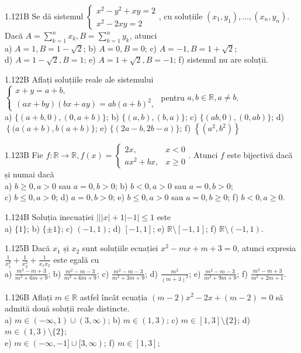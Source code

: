 \documentclass[11pt]{article}
\begin{document}
1.121B Se dă sistemul $\left\{\begin{array}{l}x^{2}-y^{2}+x y=2 \\ x^{2}-2 x y=2\end{array}\right.$, cu soluțiile $\left(x_{1}, y_{1}\right), \ldots,\left(x_{n}, y_{n}\right)$. Dacă $A=\sum_{k=1}^{n} x_{k}, B=\sum_{k=1}^{n} y_{k}$, atunci\\ a) $A=1, B=1-\sqrt{2}$; b) $A=0, B=0$; c) $A=-1, B=1+\sqrt{2}$;\\ d) $A=1-\sqrt{2}, B=1$; e) $A=1+\sqrt{2}, B=-1$; f) sistemul nu are soluții.

1.122B Aflați soluțiile reale ale sistemului $\left\{\begin{array}{l}x+y=a+b, \\ (a x+b y)(b x+a y)=a b(a+b)^{2},\end{array}\right.$ pentru $a, b \in \mathbb{R}, a \neq b$.\\ a) $\{(a+b, 0),(0, a+b)\}$; b) $\{(a, b),(b, a)\}$; c) $\{(a b, 0),(0, a b)\}$; d) $\left\{(a(a+b), b(a+b)\}\right.$; e) $\{(2a-b, 2b-a)\}$; f) $\left\{\left(a^{2}, b^{2}\right)\right\}$

1.123B Fie $f: \mathbb{R} \rightarrow \mathbb{R}, f(x)=\left\{\begin{array}{ll}2 x, & x<0 \\ a x^{2}+b x, & x \geq 0\end{array}\right.$. Atunci $f$ este bijectivă dacă și numai dacă\\ a) $b \geq 0, a>0$ sau $a=0, b>0$; b) $b<0, a>0$ sau $a=0, b>0$;\\ c) $b \leq 0, a>0$; d) $a=0, b>0$; e) $b \leq 0, a>0$ sau $a=0, b \geq 0$; f) $b<0, a \geq 0$.

1.124B Soluția inecuației $|||x|+1|-1| \leq 1$ este\\ a) $\{1\}$; b) $\{ \pm 1\}$; c) $(-1,1)$; d) $[-1,1]$; e) $\mathbb{R} \setminus[-1,1]$; f) $\mathbb{R} \setminus(-1,1)$.

1.125B Dacă $x_{1}$ și $x_{2}$ sunt soluțiile ecuației $x^{2}-m x+m+3=0$, atunci expresia $\frac{1}{x_{1}^{2}}+\frac{1}{x_{2}^{2}}+\frac{1}{x_{1} x_{2}}$ este egală $\mathrm{cu}$\\ a) $\frac{m^{2}-m+3}{m^{2}+6 m+9}$; b) $\frac{m^{2}-m-3}{m^{2}+6 m+9}$; c) $\frac{m^{2}-m-3}{m^{2}+3 m+9}$; d) $\frac{m^{2}}{(m+3)^{2}}$; e) $\frac{m^{2}-m-3}{m^{2}+9 m+9}$; f) $\frac{m^{2}-m+3}{m^{2}+2 m+1}$.

1.126B Aflați $m \in \mathbb{R}$ astfel încât ecuația $(m-2) x^{2}-2 x+(m-2)=0$ să admită două soluții reale distincte.\\ a) $m \in(-\infty, 1) \cup(3, \infty)$; b) $m \in(1,3)$; c) $m \in[1,3] \setminus\{2\}$; d) $m \in(1,3) \setminus\{2\}$;\\ e) $m \in(-\infty,-1] \cup[3, \infty)$; f) $m \in[1,3]$;
\end{document}
